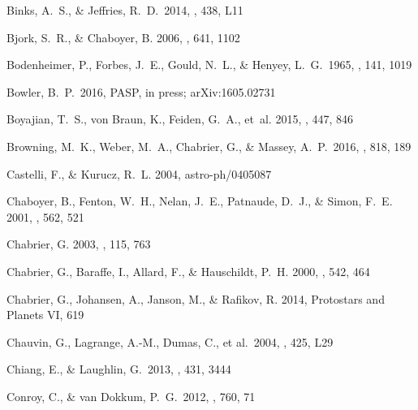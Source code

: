 \begin{thebibliography}{56}
 Binks, A.~S., \& Jeffries, R.~D.\ 2014, \mnras, 438, L11

{Bjork}, S.~R., \& {Chaboyer}, B. 2006, \apj, 641, 1102

 Bodenheimer, P., Forbes, J.~E., Gould, N.~L., \& Henyey, L.~G.\ 1965, \apj, 141, 1019

 Bowler, B.~P.\ 2016, PASP, in press; arXiv:1605.02731

{Boyajian}, T.~S., {von Braun}, K., {Feiden}, G.~A., {et~al.} 2015, \mnras, 447, 846

 Browning, M.~K., Weber, M.~A., Chabrier, G., \& Massey, A.~P.\ 2016, \apj, 818, 189

{Castelli}, F., \& {Kurucz}, R.~L. 2004, astro-ph/0405087

Chaboyer, B., Fenton, W.~H., Nelan, J.~E., Patnaude, D.~J., \& Simon, F.~E.
  2001, \apj, 562, 521

{Chabrier}, G. 2003, \pasp, 115, 763

Chabrier, G., Baraffe, I., Allard, F., \& Hauschildt, P.~H. 2000, \apj, 542,
  464

Chabrier, G., Johansen, A., Janson, M., \& Rafikov, R. 2014, Protostars and
  Planets VI, 619
  
 Chauvin, G., Lagrange, A.-M., Dumas, C., et al.\ 2004, \aap, 425, L29

 Chiang, E., \& Laughlin, G.\ 2013, \mnras, 431, 3444

 Conroy, C., \& van Dokkum, P.~G.\ 2012, \apj, 760, 71


\end{thebibliography}
